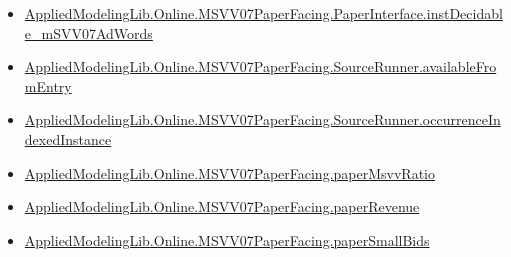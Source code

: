 \documentclass[10pt]{article}
\begin{document}
\begin{itemize}
\item \hyperlink{governing-declaration-db9e33d2c816fc88}{Applied\allowbreak{}Modeling\allowbreak{}Lib.\allowbreak{}Online.\allowbreak{}MSVV07\allowbreak{}Paper\allowbreak{}Facing.\allowbreak{}Paper\allowbreak{}Interface.\allowbreak{}inst\allowbreak{}Decidable\_\allowbreak{}m\allowbreak{}SVV07\allowbreak{}Ad\allowbreak{}Words}
\item \hyperlink{governing-declaration-4bbcdadd485c570d}{Applied\allowbreak{}Modeling\allowbreak{}Lib.\allowbreak{}Online.\allowbreak{}MSVV07\allowbreak{}Paper\allowbreak{}Facing.\allowbreak{}Source\allowbreak{}Runner.\allowbreak{}available\allowbreak{}From\allowbreak{}Entry}
\item \hyperlink{governing-declaration-15d177ff0033a703}{Applied\allowbreak{}Modeling\allowbreak{}Lib.\allowbreak{}Online.\allowbreak{}MSVV07\allowbreak{}Paper\allowbreak{}Facing.\allowbreak{}Source\allowbreak{}Runner.\allowbreak{}occurrence\allowbreak{}Indexed\allowbreak{}Instance}
\item \hyperlink{governing-declaration-11865634591d1a39}{Applied\allowbreak{}Modeling\allowbreak{}Lib.\allowbreak{}Online.\allowbreak{}MSVV07\allowbreak{}Paper\allowbreak{}Facing.\allowbreak{}paper\allowbreak{}Msvv\allowbreak{}Ratio}
\item \hyperlink{governing-declaration-3d5795d9eda3f090}{Applied\allowbreak{}Modeling\allowbreak{}Lib.\allowbreak{}Online.\allowbreak{}MSVV07\allowbreak{}Paper\allowbreak{}Facing.\allowbreak{}paper\allowbreak{}Revenue}
\item \hyperlink{governing-declaration-486965f4d3a16406}{Applied\allowbreak{}Modeling\allowbreak{}Lib.\allowbreak{}Online.\allowbreak{}MSVV07\allowbreak{}Paper\allowbreak{}Facing.\allowbreak{}paper\allowbreak{}Small\allowbreak{}Bids}
\end{itemize}
\end{document}
